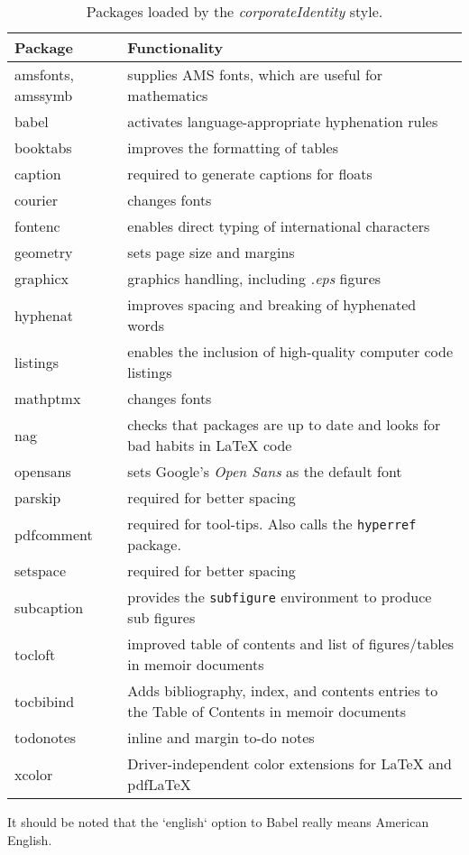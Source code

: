 \begin{table}[!ht]
\centering
\caption[Packages loaded by the corporateIdentity style]{Packages loaded by the \emph{corporateIdentity} style.}
\label{tab:incpacks}
\begin{tabular}{p{}p{}}
\toprule
Package &  Functionality\\
\midrule
amsfonts, amssymb & supplies AMS fonts, which are useful for mathematics \\
babel &  activates language-appropriate hyphenation rules\\
booktabs & improves the formatting of tables \\
caption & required to generate captions for floats\\
courier& changes fonts \\
fontenc &  enables direct typing of international characters \\
geometry & sets page size and margins \\
graphicx & graphics handling, including \emph{.eps} figures \\
hyphenat & improves spacing and breaking of hyphenated words \\
listings & enables the inclusion of high-quality computer code listings\\
mathptmx& changes fonts \\
nag & checks that packages are up to date and looks for bad habits in LaTeX code\\
opensans& sets Google's \emph{Open Sans} as the default font\\
parskip & required for better spacing\\
pdfcomment & required for tool-tips. Also calls the \texttt{hyperref} package.\\
setspace & required for better spacing\\
subcaption & provides the \texttt{subfigure} environment to produce sub figures \\
tocloft & improved table of contents and list of figures/tables in memoir documents\\
tocbibind &  Adds bibliography, index, and contents entries to the Table of Contents in memoir documents\\
todonotes &  inline and margin to-do notes \\
xcolor &  Driver-independent color extensions for LaTeX and pdfLaTeX\\
\bottomrule
\end{tabular}
\end{table}

It should be noted that the `english` option to Babel really means American English.
